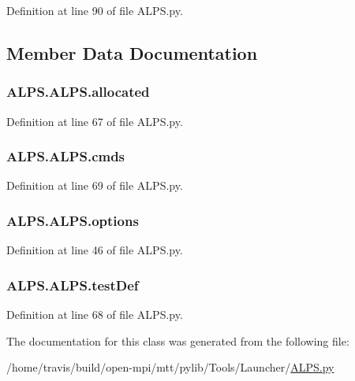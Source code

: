Definition at line 90 of file A\-L\-P\-S.\-py.



\subsection{Member Data Documentation}
\hypertarget{class_a_l_p_s_1_1_a_l_p_s_ac371dce53e8c120f7031259025562bdb}{
\subsubsection[{allocated}]{\setlength{\rightskip}{0pt plus 5cm}A\-L\-P\-S.\-A\-L\-P\-S.\-allocated}}\label{class_a_l_p_s_1_1_a_l_p_s_ac371dce53e8c120f7031259025562bdb}


Definition at line 67 of file A\-L\-P\-S.\-py.

\hypertarget{class_a_l_p_s_1_1_a_l_p_s_a64bae95ba692ef4df06f716692b50ee9}{
\subsubsection[{cmds}]{\setlength{\rightskip}{0pt plus 5cm}A\-L\-P\-S.\-A\-L\-P\-S.\-cmds}}\label{class_a_l_p_s_1_1_a_l_p_s_a64bae95ba692ef4df06f716692b50ee9}


Definition at line 69 of file A\-L\-P\-S.\-py.

\hypertarget{class_a_l_p_s_1_1_a_l_p_s_a24dfa9b508f507c4cb6148f10a081555}{
\subsubsection[{options}]{\setlength{\rightskip}{0pt plus 5cm}A\-L\-P\-S.\-A\-L\-P\-S.\-options}}\label{class_a_l_p_s_1_1_a_l_p_s_a24dfa9b508f507c4cb6148f10a081555}


Definition at line 46 of file A\-L\-P\-S.\-py.

\hypertarget{class_a_l_p_s_1_1_a_l_p_s_a839c4f84a46683221d51004c08345ff2}{
\subsubsection[{test\-Def}]{\setlength{\rightskip}{0pt plus 5cm}A\-L\-P\-S.\-A\-L\-P\-S.\-test\-Def}}\label{class_a_l_p_s_1_1_a_l_p_s_a839c4f84a46683221d51004c08345ff2}


Definition at line 68 of file A\-L\-P\-S.\-py.



The documentation for this class was generated from the following file\-:\begin{DoxyCompactItemize}
\item 
/home/travis/build/open-\/mpi/mtt/pylib/\-Tools/\-Launcher/\hyperlink{_a_l_p_s_8py}{A\-L\-P\-S.\-py}\end{DoxyCompactItemize}
